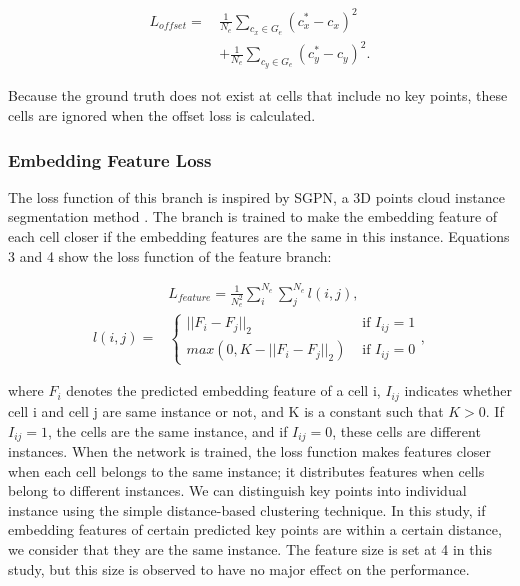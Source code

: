 \documentclass[journal]{IEEEtran}
\begin{document}
\begin{equation}
    \begin{aligned}
        L_{offset} = \, &\frac{1}{N_{e}} \sum_{c_x \in G_{e}}{(c_x^*-c_x)}^2
        \\
        &+ \frac{1}{N_{e}} \sum_{c_y \in G_{e}}(c_y^*-c_y)^2 .
    \end{aligned}
\end{equation}

Because the ground truth does not exist at cells that include no key points, these cells are ignored when the offset loss is calculated.

\subsubsection{Embedding Feature Loss}
The loss function of this branch is inspired by SGPN, a 3D points cloud instance segmentation method \cite{wang2018sgpn}. The branch is trained to make the embedding feature of each cell closer if the embedding features are the same in this instance. Equations 3 and 4 show the loss function of the feature branch:

\begin{equation}
    \begin{aligned}
        & L_{feature} = \frac{1}{N_{e}^2} \sum_{i}^{N_e} \sum_{j}^{N_e} l(i,j) ,
        \\
        l(i,j) = & 
        \begin{cases}
            ||F_i - F_j||_2 & \text{ if } I_{ij} = 1  \\ 
            max(0, K - ||F_i - F_j||_2) & \text{ if } I_{ij} = 0
        \end{cases} ,       
    \end{aligned}
\end{equation}

where $F_i$ denotes the predicted embedding feature of a cell i, $I_{ij}$ indicates whether cell i and cell j are same instance or not, and K is a constant such that $K>0$. If $I_{ij} = 1$, the cells are the same instance, and if $I_{ij} = 0$, these cells are different instances. When the network is trained, the loss function makes features closer when each cell belongs to the same instance; it distributes features when cells belong to different instances. We can distinguish key points into individual instance using the simple distance-based clustering technique. In this study, if embedding features of certain predicted key points are within a certain distance, we consider that they are the same instance. The feature size is set at 4 in this study, but this size is observed to have no major effect on the performance.
\end{document}
